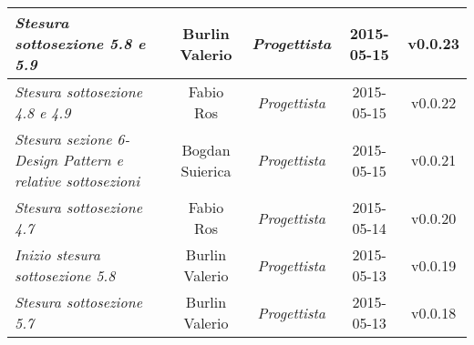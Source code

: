 \begin{table}[h]
\begin{tabular}{|p{}|c|c|c|c|}
	\midrule
		\textit{Stesura sottosezione 5.8 e 5.9} & Burlin Valerio & \textit{Progettista} & 2015-05-15 & v0.0.23 \\
	\midrule
		\textit{Stesura sottosezione 4.8 e 4.9} & Fabio Ros & \textit{Progettista} & 2015-05-15 & v0.0.22 \\
	\midrule
		\textit{Stesura sezione 6-Design Pattern e relative sottosezioni} & Bogdan Suierica & \textit{Progettista} & 2015-05-15 & v0.0.21 \\
	\midrule
		\textit{Stesura sottosezione 4.7} & Fabio Ros & \textit{Progettista} & 2015-05-14 & v0.0.20 \\
	\midrule
		\textit{Inizio stesura sottosezione 5.8} & Burlin Valerio & \textit{Progettista} & 2015-05-13 & v0.0.19 \\
	\midrule
		\textit{Stesura sottosezione 5.7} & Burlin Valerio & \textit{Progettista} & 2015-05-13 & v0.0.18 \\
	\bottomrule
\end{tabular}	
\end{table}

\newpage

